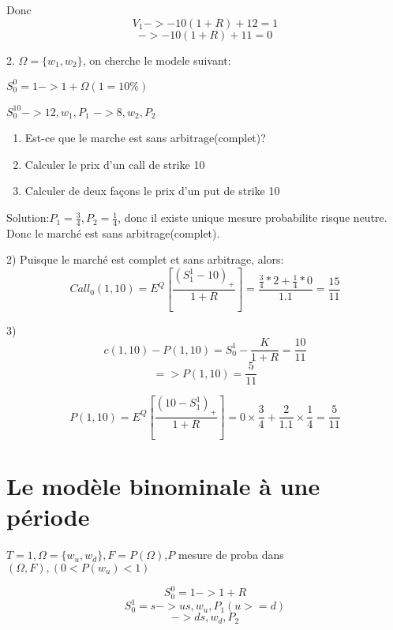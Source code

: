 \documentclass{article}
\begin{document}
Donc 
\begin{equation}
V_1-> -10(1+R)+12=1
\end{equation}
\begin{equation}
->-10(1+R)+11=0
\end{equation}


2. $\Omega=\{w_1, w_2\}$, on cherche le modele suivant:

$S_0^0=1 -> 1+\Omega(1=10\%)$

$S_0^10->12, w_1, P_1$
$-> 8, w_2, P_2$

\begin{enumerate}
\item Est-ce que le marche est sans arbitrage(complet)?
\item Calculer le prix d'un call de strike 10
\item Calculer de deux fa\c{c}ons le prix d'un put de strike 10
\end{enumerate}

Solution:$P_1=\frac{3}{4}, P_2=\frac{1}{4}$, donc il existe unique mesure probabilite risque neutre. Donc le march\'e est sans arbitrage(complet).

2) Puisque le march\'e est complet et sans arbitrage, alors:
\begin{equation}
Call_0(1,10) = E^Q[\frac{(S_1^1-10)_+}{1+R}]=\frac{\frac{3}{4}*2+\frac{1}{4}*0}{1.1}=\frac{15}{11}
\end{equation}

3) 
\begin{equation}
c(1,10)-P(1,10)=S_0^1-\frac{K}{1+R}=\frac{10}{11}
\end{equation}
\begin{equation}
=>P(1,10)=\frac{5}{11}
\end{equation}

\begin{equation}
P(1,10) = E^Q[\frac{(10-S_1^1)_+}{1+R}]=0\times\frac{3}{4}+\frac{2}{1.1}\times\frac{1}{4}=\frac{5}{11}
\end{equation}

\section{Le mod\`ele binominale \`a une p\'eriode}

$T=1,\Omega=\{w_u,w_d\},F=P(\Omega)$,$P$ mesure de proba dans $(\Omega,F),(0<P(w_u)<1)$

\begin{equation}
S_0^0=1->1+R
\end{equation}
\begin{equation}
S_0^1=s->us, w_u,P_1(u>=d)
\end{equation}
\begin{equation}
->ds, w_d, P_2
\end{equation}
\end{document}
